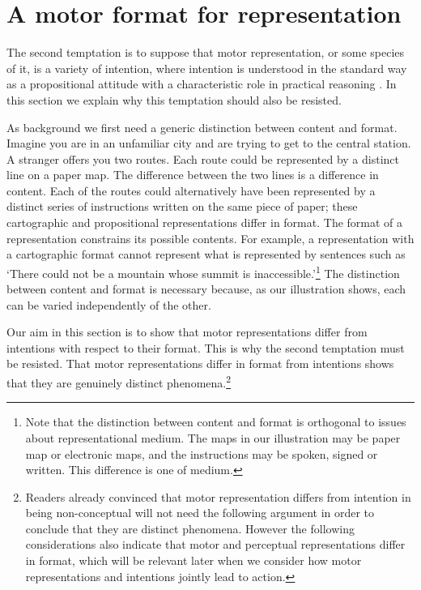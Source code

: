 \documentclass[12pt,\papersize]{extarticle}
\begin{document}
\setlength\footnotesep{1em}


\maketitle
\title{}



\section{A motor format for representation}

The second temptation is to suppose that motor representation, or some species of it, is a variety of intention, where intention is understood in the standard way as a propositional attitude with a characteristic role in practical reasoning \citep{Bratman:1987xw}. In this section we explain why this temptation should also be resisted. 

As background we first need a generic distinction between content and format. Imagine you are in an unfamiliar city and are trying to get to the central station. A stranger offers you two routes. Each route could be represented by a distinct line on a paper map. The difference between the two lines is a difference in content. Each of the routes could alternatively have been represented by a distinct series of instructions written on the same piece of paper; these cartographic and propositional representations differ in format. The format of a representation constrains its possible contents. For example, a representation with a cartographic format cannot represent what is represented by sentences such as `There could not be a mountain whose summit is inaccessible.'\footnote{Note that the distinction between content and format is orthogonal to issues about representational medium. The maps in our illustration may be paper map or electronic maps, and the instructions may be spoken, signed or written. This difference is one of medium.} The distinction between content and format is necessary because, as our illustration shows, each can be varied independently of the other.

Our aim in this section is to show that motor representations differ from intentions with respect to their format. This is why the second temptation must be resisted. That motor representations differ in format from intentions shows that they are genuinely distinct phenomena.\footnote{ Readers already convinced that motor representation differs from intention in being non-conceptual will not need the following argument in order to conclude that they are distinct phenomena. However the following considerations also indicate that motor and perceptual representations differ in format, which will be relevant later when we consider how motor representations and intentions jointly lead to action.}
\end{document}
